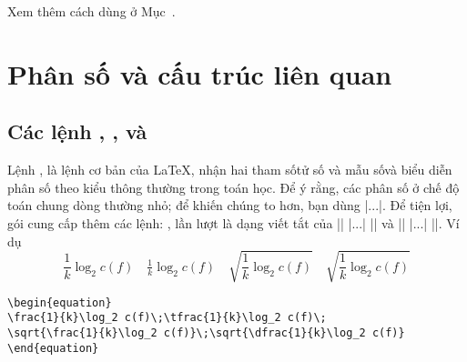 \medskip
Xem thêm cách dùng  ở Mục~.

\section{Phân số và cấu trúc liên quan}

\subsection{Các lệnh , , và }

Lệnh , là lệnh cơ bản của \LaTeX{}, nhận hai tham số\mdash tử số
và mẫu số\mdash và biểu diễn phân số theo kiểu thông thường trong toán học.
Để ý rằng, các phân số ở chế độ toán chung dòng thường nhỏ; để khiến chúng
to hơn, bạn dùng |\displaystyle\frac...|. Để tiện lợi,
gói  cung cấp thêm các lệnh: ,  lần lượt
là dạng viết tắt của |{\displaystyle\frac| |...| |}| và
|{\textstyle\frac| |...| |}|. Ví dụ
\begin{equation}
\frac{1}{k}\log_2 c(f)\quad\tfrac{1}{k}\log_2 c(f)\quad
\sqrt{\frac{1}{k}\log_2 c(f)}\quad\sqrt{\dfrac{1}{k}\log_2 c(f)}
\end{equation}
\begin{verbatim}
\begin{equation}
\frac{1}{k}\log_2 c(f)\;\tfrac{1}{k}\log_2 c(f)\;
\sqrt{\frac{1}{k}\log_2 c(f)}\;\sqrt{\dfrac{1}{k}\log_2 c(f)}
\end{equation}
\end{verbatim}

